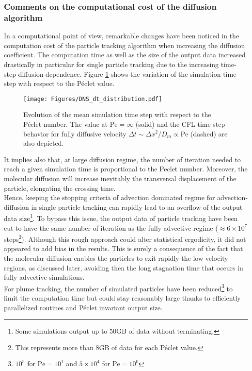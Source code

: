 \subsubsection{Comments on the computational cost of the diffusion algorithm}
In a computational point of view, remarkable changes have been noticed in the computation cost of the particle tracking algorithm when increasing the diffusion coefficient.
The computation time as well as the size of the output data increased drastically in particular for single particle tracking due to the increasing time-step diffusion dependence.
Figure \ref{fig:time_step_pe} shows the variation of the simulation time-step with respect to the Péclet value. 
\begin{figure}[h!]
	\centering
	\texttt{[image: Figures/DNS\_dt\_distribution.pdf]}
	\caption{Evolution of the mean simulation time step with respect to the Péclet number. The value at $\mathrm{Pe} = \infty$ (solid) and the CFL time-step behavior for fully diffusive velocity $\Delta t\sim \Delta x^2/D_m \propto\mathrm{Pe}$ (dashed) are also depicted.}
	\label{fig:time_step_pe}
\end{figure}
It implies also that, at large diffusion regime, the number of iteration needed to reach a given simulation time is proportional to the Peclet number.
Moreover, the molecular diffusion will increase inevitably the transversal displacement of the particle, 
elongating the crossing time.\\
Hence, keeping the stopping criteria of advection dominated regime for advection-diffusion in single particle tracking can rapidly lead to an overflow of the output data size\footnote{Some simulations output up to 50GB of data without terminating.}.
To bypass this issue, the output data of particle tracking have been cut to have the same number of iteration as the fully advective regime ($\approx6 \times 10^7$ steps\footnote{This represents more than 8GB of data for each Péclet value.}). 
Although this rough approach could alter statistical ergodicity, it did not appeared to add bias in the results. 
This is surely a consequence of the fact that the molecular diffusion enables the particles to exit rapidly the low velocity regions, as discussed later, avoiding then the long stagnation time that occurs in fully advective simulations.\\
For plume tracking, the number of simulated particles have been reduced\footnote{$10^5$ for $\mathrm{Pe}=10^1$ and $5\times10^4$ for $\mathrm{Pe}=10^0$} to limit the computation time but could stay reasonably large thanks to efficiently parallelized routines and Péclet invariant output size.

